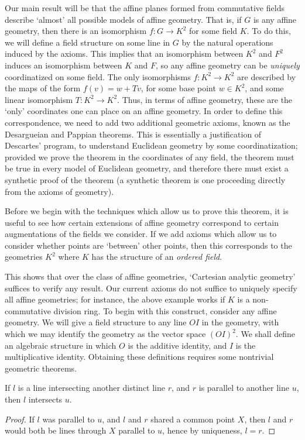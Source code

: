 Our main result will be that the affine planes formed from commutative fields describe `almost' all possible models of affine geometry. That is, if $G$ is any affine geometry, then there is an isomorphism $f: G \to K^2$ for some field $K$. To do this, we will define a field structure on some line in $G$ by the natural operations induced by the axioms. This implies that an isomorphism between $K^2$ and $F^2$ induces an isomorphism between $K$ and $F$, so any affine geometry can be {\it uniquely} coordinatized on some field. The only isomorphisms $f: K^2 \to K^2$ are described by the maps of the form $f(v) = w + Tv$, for some base point $w \in K^2$, and some linear isomorphism $T: K^2 \to K^2$. Thus, in terms of affine geometry, these are the `only' coordinates one can place on an affine geometry. In order to define this correspondence, we need to add two additional geometric axioms, known as the Desargueian and Pappian theorems. This is essentially a justification of Descartes' program, to understand Euclidean geometry by some coordinatization; provided we prove the theorem in the coordinates of any field, the theorem must be true in every model of Euclidean geometry, and therefore there must exist a synthetic proof of the theorem (a synthetic theorem is one proceeding directly from the axioms of geometry).

Before we begin with the techniques which allow us to prove this theorem, it is useful to see how certain extensions of affine geometry correspond to certain augmentations of the fields we consider. If we add axioms which allow us to consider whether points are `between' other points, then this corresponds to the geometries $K^2$ where $K$ has the structure of an {\it ordered field}.

This shows that over the class of affine geometries, `Cartesian analytic geometry' suffices to verify any result. Our current axioms do not suffice to uniquely specify all affine geometries; for instance, the above example works if $K$ is a non-commutative division ring. To begin with this construct, consider any affine geometry. We will give a field structure to any line $OI$ in the geometry, with which we may identify the geometry as the vector space $(OI)^2$. We shall define an algebraic structure in which $O$ is the additive identity, and $I$ is the multiplicative identity. Obtaining these definitions requires some nontrivial geometric theorems.

\begin{lemma}
    If $l$ is a line intersecting another distinct line $r$, and $r$ is parallel to another line $u$, then $l$ intersects $u$.
\end{lemma}
\begin{proof}
    If $l$ was parallel to $u$, and $l$ and $r$ shared a common point $X$, then $l$ and $r$ would both be lines through $X$ parallel to $u$, hence by uniqueness, $l = r$.
\end{proof}

